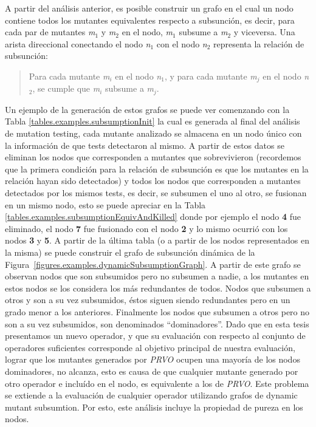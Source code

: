 A partir del an\'alisis anterior, es posible construir un grafo en el cual un nodo contiene todos los mutantes equivalentes respecto a subsunci\'on, es decir, para cada par de mutantes \emph{m$_1$} y \emph{m$_2$} en el nodo, \emph{m$_1$} subsume a \emph{m$_2$} y viceversa. Una arista direccional conectando el nodo \emph{n$_1$} con el nodo \emph{n$_2$} representa la relaci\'on de subsunci\'on:
\begin{quote}
	Para cada mutante \emph{m$_i$} en el nodo \emph{n$_1$}, y para cada mutante \emph{m$_j$} en el nodo \emph{n$_2$}, se cumple que \emph{m$_i$} subsume a \emph{m$_j$}.
\end{quote}
Un ejemplo de la generaci\'on de estos grafos se puede ver comenzando con la Tabla \ref{tables.examples.subsumptionInit} la cual es generada al final del an\'alisis de mutation testing, cada mutante analizado se almacena en un nodo \'unico con la informaci\'on de que tests detectaron al mismo. A partir de estos datos se eliminan los nodos que corresponden a mutantes que sobrevivieron (recordemos que la primera condici\'on para la relaci\'on de subsunci\'on es que los mutantes en la relaci\'on hayan sido detectados) y todos los nodos que corresponden a mutantes detectados por los mismos tests, es decir, se subsumen el uno al otro, se fusionan en un mismo nodo, esto se puede apreciar en la Tabla \ref{tables.examples.subsumptionEquivAndKilled} donde por ejemplo el nodo \textbf{4} fue eliminado, el nodo \textbf{7} fue fusionado con el nodo \textbf{2} y lo mismo ocurri\'o con los nodos \textbf{3} y \textbf{5}. A partir de la \'ultima tabla (o a partir de los nodos representados en la misma) se puede construir el grafo de subsunci\'on din\'amica de la Figura~\ref{figures.examples.dynamicSubsumptionGraph}.
A partir de este grafo se observan nodos que son subsumidos pero no subsumen a nadie, a los mutantes en estos nodos se los considera los m\'as redundantes de todos. Nodos que subsumen a otros y son a su vez subsumidos, \'estos siguen siendo redundantes pero en un grado menor a los anteriores. Finalmente los nodos que subsumen a otros pero no son a su vez subsumidos, son denominados ``dominadores''. Dado que en esta tesis presentamos un nuevo operador, y que su evaluaci\'on con respecto al conjunto de operadores suficientes corresponde al objetivo principal de nuestra evaluaci\'on, lograr que los mutantes generados por \emph{PRVO} ocupen una mayor\'ia de los nodos dominadores, no alcanza, esto es causa de que cualquier mutante generado por otro operador e inclu\'ido en el nodo, es equivalente a los de \emph{PRVO}. Este problema se extiende a la evaluaci\'on de cualquier operador utilizando grafos de dynamic mutant subsumtion. Por esto, este an\'alisis incluye la propiedad de pureza en los nodos.
